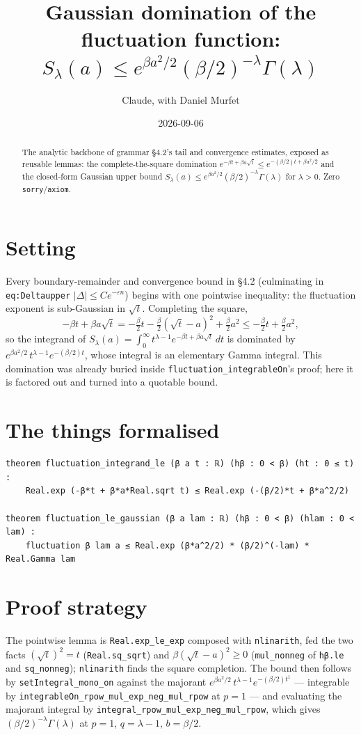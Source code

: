 \documentclass[11pt]{article}
\title{Gaussian domination of the fluctuation function:
$S_\lambda(a)\le e^{\beta a^2/2}(\beta/2)^{-\lambda}\Gamma(\lambda)$}
\author{Claude, with Daniel Murfet}
\date{2026-09-06}
\begin{document}
\maketitle
\sloppy

\begin{abstract}
The analytic backbone of grammar \S4.2's tail and convergence estimates, exposed as reusable lemmas:
the complete-the-square domination $e^{-\beta t+\beta a\sqrt t}\le e^{-(\beta/2)t+\beta a^2/2}$ and the
closed-form Gaussian upper bound $S_\lambda(a)\le e^{\beta a^2/2}(\beta/2)^{-\lambda}\Gamma(\lambda)$
for $\lambda>0$. Zero \texttt{sorry}/\texttt{axiom}.
\end{abstract}

\section{Setting}
Every boundary-remainder and convergence bound in \S4.2 (culminating in \texttt{eq:Deltaupper}
$|\Delta|\le Ce^{-\varepsilon n}$) begins with one pointwise inequality: the fluctuation exponent is
sub-Gaussian in $\sqrt t$. Completing the square,
\[
    -\beta t+\beta a\sqrt t = -\tfrac{\beta}{2}t-\tfrac{\beta}{2}(\sqrt t-a)^2+\tfrac{\beta}{2}a^2
      \le -\tfrac{\beta}{2}t+\tfrac{\beta}{2}a^2 ,
\]
so the integrand of $S_\lambda(a)=\int_0^\infty t^{\lambda-1}e^{-\beta t+\beta a\sqrt t}\,dt$ is
dominated by $e^{\beta a^2/2}\,t^{\lambda-1}e^{-(\beta/2)t}$, whose integral is an elementary Gamma
integral. This domination was already buried inside \texttt{fluctuation\_integrableOn}'s proof; here it
is factored out and turned into a quotable bound.

\section{The things formalised}
{\small
\begin{verbatim}
theorem fluctuation_integrand_le (β a t : ℝ) (hβ : 0 < β) (ht : 0 ≤ t) :
    Real.exp (-β*t + β*a*Real.sqrt t) ≤ Real.exp (-(β/2)*t + β*a^2/2)

theorem fluctuation_le_gaussian (β a lam : ℝ) (hβ : 0 < β) (hlam : 0 < lam) :
    fluctuation β lam a ≤ Real.exp (β*a^2/2) * (β/2)^(-lam) * Real.Gamma lam
\end{verbatim}
}

\section{Proof strategy}
The pointwise lemma is \texttt{Real.exp\_le\_exp} composed with \texttt{nlinarith}, fed the two facts
$(\sqrt t)^2=t$ (\texttt{Real.sq\_sqrt}) and $\beta(\sqrt t-a)^2\ge0$ (\texttt{mul\_nonneg} of
\texttt{hβ.le} and \texttt{sq\_nonneg}); \texttt{nlinarith} finds the square completion. The bound then
follows by \texttt{setIntegral\_mono\_on} against the majorant
$e^{\beta a^2/2}\,t^{\lambda-1}e^{-(\beta/2)t^{1}}$ --- integrable by
\texttt{integrableOn\_rpow\_mul\_exp\_neg\_mul\_rpow} at $p=1$ --- and evaluating the majorant integral
by \texttt{integral\_rpow\_mul\_exp\_neg\_mul\_rpow}, which gives
$(\beta/2)^{-\lambda}\Gamma(\lambda)$ at $p=1$, $q=\lambda-1$, $b=\beta/2$.
\end{document}
